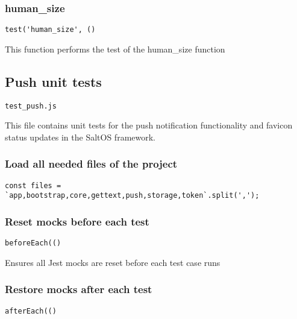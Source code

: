 \documentclass[a4paper]{article}
\begin{document}
\hypertarget{toc239}{}
\subsubsection{human\_size}

\begin{lstlisting}
test('human_size', ()
\end{lstlisting}

This function performs the test of the human\_size function

\hypertarget{toc240}{}
\subsection{Push unit tests}

\begin{lstlisting}
test_push.js
\end{lstlisting}

This file contains unit tests for the push notification functionality
and favicon status updates in the SaltOS framework.

\hypertarget{toc241}{}
\subsubsection{Load all needed files of the project}

\begin{lstlisting}
const files = `app,bootstrap,core,gettext,push,storage,token`.split(',');
\end{lstlisting}

\hypertarget{toc242}{}
\subsubsection{Reset mocks before each test}

\begin{lstlisting}
beforeEach(()
\end{lstlisting}

Ensures all Jest mocks are reset before each test case runs

\hypertarget{toc243}{}
\subsubsection{Restore mocks after each test}

\begin{lstlisting}
afterEach(()
\end{lstlisting}
\end{document}
